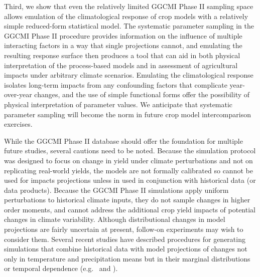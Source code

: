 \documentclass[preprint, 5p, times, twocolumn]{elsarticle}
\begin{document}
Third, we show that even the relatively limited GGCMI Phase II sampling space allows emulation of the climatological response of crop models with a relatively simple reduced-form statistical model. The systematic parameter sampling in the GGCMI Phase II procedure provides information on the influence of multiple interacting factors in a way that single projections cannot, and emulating the resulting response surface then produces a tool that can aid in both physical interpretation of the process-based models and in assessment of agricultural impacts under arbitrary climate scenarios. Emulating the climatological response isolates long-term impacts from any confounding factors that complicate year-over-year changes, and the use of simple functional forms offer the possibility of physical interpretation of parameter values. We anticipate that systematic parameter sampling will become the norm in future crop model intercomparison exercises.


While the GGCMI Phase II database should offer the foundation for multiple future studies, several cautions need to be noted. Because the simulation protocol was designed to focus on change in yield under climate perturbations and not on replicating real-world yields, the models are not formally calibrated so cannot be used for impacts projections unless in used in conjunction with historical data (or data products). Because the GGCMI Phase II simulations apply uniform perturbations to historical climate inputs, they do not sample changes in higher order moments, and cannot address the additional crop yield impacts of potential changes in climate variability. Although distributional changes in model projections are fairly uncertain at present, follow-on experiments may wish to consider them. Several recent studies have described procedures for generating simulations that combine historical data with model projections of changes not only in temperature and precipitation means but in their marginal distributions or temporal dependence (e.g.\ \citet{Leeds2015, poppick2016, Won16} and \citet{Haugen2018}). 

\end{document}
